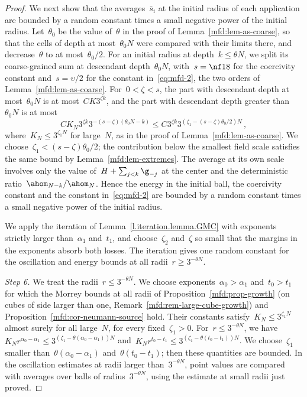 \documentclass[11pt]{amsart}
\begin{document}
\begin{proof}
\smallskip

We next show that the averages~$\bar s_i$ at the initial radius of each application are bounded by a random constant times a small negative power of the initial radius. Let~$\theta_0$ be the value of~$\theta$ in the proof of Lemma~\ref{mfd:lem-as-coarse}, so that the cells of depth at most~$\theta_0N$ were compared with their limits there, and decrease~$\theta$ to at most~$\theta_0/2$. For an initial radius at depth~$k\leq\theta N$, we split its coarse-grained sum at descendant depth~$\theta_0N$, with~$s=\nf18$ for the coercivity constant and~$s=\upsilon/2$ for the constant in~\eqref{eq:mfd-2}, the two orders of Lemma~\ref{mfd:lem-as-coarse}. For~$0<\zeta<s$, the part with descendant depth at most~$\theta_0N$ is at most~$CK3^{\zeta k}$, and the part with descendant depth greater than~$\theta_0N$ is at most
\begin{equation*}
	CK_N3^{\zeta k}3^{-(s-\zeta)(\theta_0N-k)}
	\leq C3^{\zeta k}3^{(\zeta_1-(s-\zeta)\theta_0/2)N}\,,
\end{equation*}
where~$K_N\leq3^{\zeta_1 N}$ for large~$N$, as in the proof of Lemma~\ref{mfd:lem-as-coarse}. We choose~$\zeta_1<(s-\zeta)\theta_0/2$; the contribution below the smallest field scale satisfies the same bound by Lemma~\ref{mfd:lem-extremes}. The average at its own scale involves only the value of~$H+\sum_{j<k}\g_{-j}$ at the center and the deterministic ratio~$\ahom_{N-k}/\ahom_N$. Hence the energy in the initial ball, the coercivity constant and the constant in~\eqref{eq:mfd-2} are bounded by a random constant times a small negative power of the initial radius.

\smallskip

We apply the iteration of Lemma~\ref{l.iteration.lemma.GMC} with exponents strictly larger than~$\alpha_1$ and~$t_1$, and choose~$\zeta_2$ and~$\zeta$ so small that the margins in the exponents absorb both losses. The iteration gives one random constant for the oscillation and energy bounds at all radii~$r\geq 3^{-\theta N}$.

\smallskip

\emph{Step 6.} We treat the radii~$r\leq 3^{-\theta N}$. We choose exponents~$\alpha_0>\alpha_1$ and~$t_0>t_1$ for which the Morrey bounds at all radii of Proposition~\ref{mfd:prop-growth} (on cubes of side larger than one, Remark~\ref{mfd:rem-large-cube-growth}) and Proposition~\ref{mfd:cor-neumann-source} hold. Their constants satisfy~$K_N\leq3^{\zeta_1 N}$ almost surely for all large~$N$, for every fixed~$\zeta_1>0$. For~$r\leq 3^{-\theta N}$, we have~$K_Nr^{\alpha_0-\alpha_1}\leq3^{(\zeta_1-\theta(\alpha_0-\alpha_1))N}$ and~$K_Nr^{t_0-t_1}\leq3^{(\zeta_1-\theta(t_0-t_1))N}$. We choose~$\zeta_1$ smaller than~$\theta(\alpha_0-\alpha_1)$ and~$\theta(t_0-t_1)$; then these quantities are bounded. In the oscillation estimates at radii larger than~$3^{-\theta N}$, point values are compared with averages over balls of radius~$3^{-\theta N}$, using the estimate at small radii just proved.
\end{proof}
\end{document}

